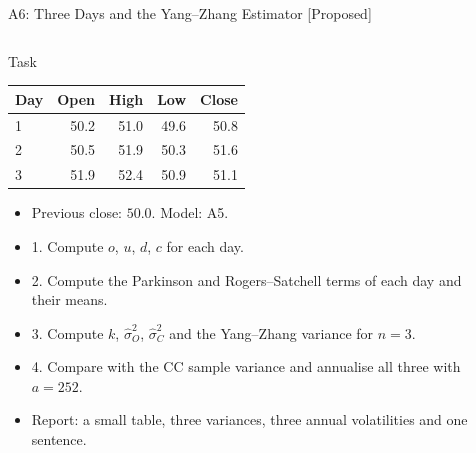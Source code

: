 \begin{frame}{A6: Three Days and the Yang--Zhang Estimator [Proposed]}
\propsub
\itemsize{\scriptsize}
\begin{columns}[T]
\begin{column}{\taskw}
\begin{block}{Task}
\begin{center}
\scriptsize
\begin{tabular}{lrrrr}
\toprule
\textbf{Day} & \textbf{Open} & \textbf{High} & \textbf{Low} & \textbf{Close} \\
\midrule
1 & 50.2 & 51.0 & 49.6 & 50.8 \\
2 & 50.5 & 51.9 & 50.3 & 51.6 \\
3 & 51.9 & 52.4 & 50.9 & 51.1 \\
\bottomrule
\end{tabular}
\end{center}
\begin{itemize}
    \item Previous close: $50.0$. Model: A5.
    \item 1. Compute $o$, $u$, $d$, $c$ for each day.
    \item 2. Compute the Parkinson and Rogers--Satchell terms of each day and their means.
    \item 3. Compute $k$, $\hat\sigma_O^2$, $\hat\sigma_C^2$ and the Yang--Zhang variance for $n = 3$.
    \item 4. Compare with the CC sample variance and annualise all three with $a = 252$.
    \item Report: a small table, three variances, three annual volatilities and one sentence.
\end{itemize}
\end{block}
\end{column}
\begin{column}{\solw}
\end{column}
\end{columns}
\end{frame}

